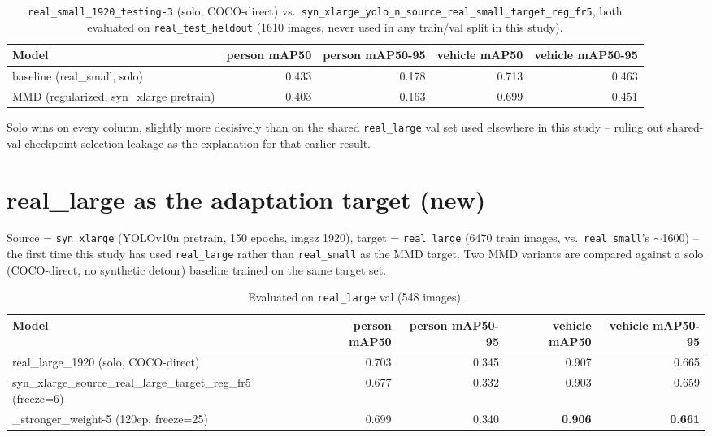 \documentclass[11pt]{article}
\begin{document}
\begin{table}[h!]
    \centering
    \begin{tabular}{lrrrr}
        \toprule
        Model & person mAP50 & person mAP50-95 & vehicle mAP50 & vehicle mAP50-95 \\
        \midrule
        baseline (real\_small, solo) & 0.433 & 0.178 & 0.713 & 0.463 \\
        MMD (regularized, syn\_xlarge pretrain) & 0.403 & 0.163 & 0.699 & 0.451 \\
        \bottomrule
    \end{tabular}
    \caption{\texttt{real\_small\_1920\_testing-3} (solo, COCO-direct) vs.\
    \texttt{syn\_xlarge\_yolo\_n\_source\_real\_small\_target\_reg\_fr5}, both
    evaluated on \texttt{real\_test\_heldout} (1610 images, never used in any
    train/val split in this study).}
\end{table}

\noindent Solo wins on every column, slightly more decisively than on the shared
\texttt{real\_large} val set used elsewhere in this study -- ruling out shared-val
checkpoint-selection leakage as the explanation for that earlier result.

\section{real\_large as the adaptation target (new)}

Source = \texttt{syn\_xlarge} (YOLOv10n pretrain, 150 epochs, imgsz 1920), target =
\texttt{real\_large} (6470 train images, vs.\ \texttt{real\_small}'s $\sim$1600) --
the first time this study has used \texttt{real\_large} rather than
\texttt{real\_small} as the MMD target. Two MMD variants are compared against a solo
(COCO-direct, no synthetic detour) baseline trained on the same target set.

\begin{table}[h!]
    \centering
    \begin{tabular}{lrrrr}
        \toprule
        Model & person mAP50 & person mAP50-95 & vehicle mAP50 & vehicle mAP50-95 \\
        \midrule
        real\_large\_1920 (solo, COCO-direct) & 0.703 & 0.345 & 0.907 & 0.665 \\
        syn\_xlarge\_source\_real\_large\_target\_reg\_fr5 (freeze=6) & 0.677 & 0.332 & 0.903 & 0.659 \\
        \quad{}\_stronger\_weight-5 (120ep, freeze=25) & 0.699 & 0.340 & \textbf{0.906} & \textbf{0.661} \\
        \bottomrule
    \end{tabular}
    \caption{Evaluated on \texttt{real\_large} val (548 images).}
\end{table}
\end{document}
